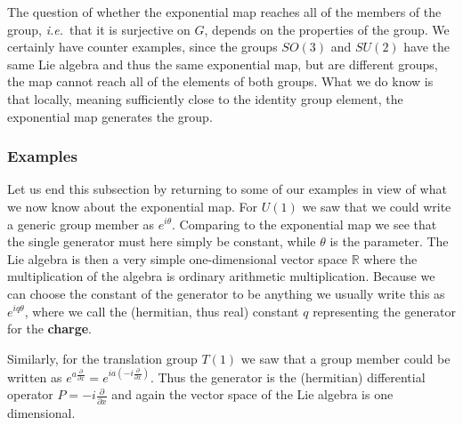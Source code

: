 \documentclass[notes.tex]{subfiles}
\begin{document}
The question of whether the exponential map reaches all of the members of the group, {\it i.e.}\ that it is surjective on $G$, depends on the properties of the group. We certainly have counter examples, since the groups $SO(3)$ and $SU(2)$ have the same Lie algebra and thus the same exponential map, but are different groups, the map cannot reach all of the elements of both groups. What we do know is that locally, meaning sufficiently close to the identity group element, the exponential map generates the group.


\subsubsection{Examples}
Let us end this subsection by returning to some of our examples in view of what we now know about the exponential map. For $U(1)$ we saw that we could write a generic group member as $e^{i\theta}$. Comparing to the exponential map we see that the single generator must here simply be constant, while $\theta$ is the parameter. The Lie algebra is then a very simple one-dimensional vector space $\mathbb R$ where the multiplication of the algebra is ordinary arithmetic multiplication. Because we can choose the constant of the generator to be anything we usually write this as $e^{iq\theta}$, where we call the (hermitian, thus real) constant  $q$ representing the generator for the {\bf charge}.

Similarly, for the translation group $T(1)$ we saw that a group member could be written as $e^{a\frac{\partial}{\partial x}}=e^{ia(-i\frac{\partial}{\partial x})}$. Thus the generator is the (hermitian) differential operator $P=-i\frac{\partial}{\partial x}$ and again the vector space of the Lie algebra is one dimensional.
\end{document}
